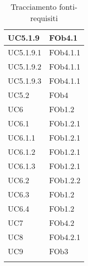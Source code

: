 \begin{longtable}{|l|l|}
\hline
		UC5.1.9 & FOb4.1 \linebreak   \\
\hline
		UC5.1.9.1 & FOb4.1.1 \linebreak   \\
\hline
		UC5.1.9.2 & FOb4.1.1 \linebreak   \\
\hline
		UC5.1.9.3 & FOb4.1.1 \linebreak   \\
\hline
		UC5.2 & FOb4 \linebreak   \\
\hline
		UC6 & FOb1.2 \linebreak   \\
\hline
		UC6.1 & FOb1.2.1 \linebreak   \\
\hline
		UC6.1.1 & FOb1.2.1 \linebreak   \\
\hline
		UC6.1.2 & FOb1.2.1 \linebreak   \\
\hline
		UC6.1.3 & FOb1.2.1 \linebreak   \\
\hline
		UC6.2 & FOb1.2.2 \linebreak   \\
\hline
		UC6.3 & FOb1.2 \linebreak   \\
\hline
		UC6.4 & FOb1.2 \linebreak   \\
\hline
		UC7 & FOb4.2 \linebreak   \\
\hline
		UC8 & FOb4.2.1 \linebreak   \\
\hline
		UC9 & FOb3 \linebreak   \\
\hline
\caption{Tracciamento fonti-requisiti}
\end{longtable}